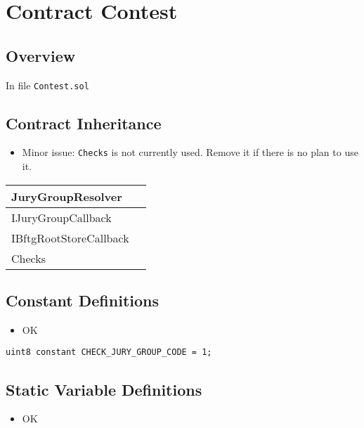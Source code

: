 
\chapter{Contract Contest}

\minitoc

\section{Overview}


In file {\tt Contest.sol}

\section{Contract Inheritance}

\begin{itemize}
\item Minor issue: {\tt Checks} is not currently used. Remove it if
  there is no plan to use it.
\end{itemize}

\noindent\begin{tabular}{|l|p{5cm}|}\hline
JuryGroupResolver & \\\hline
IJuryGroupCallback & \\\hline
IBftgRootStoreCallback & \\\hline
Checks & \\\hline
\end{tabular}

\section{Constant Definitions}

\begin{itemize}
\item OK
\end{itemize}

\begin{lstlisting}[firstnumber=15]
    uint8 constant CHECK_JURY_GROUP_CODE = 1;
\end{lstlisting}

\section{Static Variable Definitions}

\begin{itemize}
\item OK
\end{itemize}


